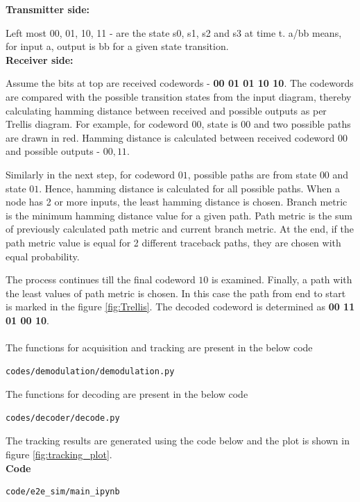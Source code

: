 \textbf{Transmitter side:} 

\noindent Left most 00, 01, 10, 11 - are the state s0, s1, s2 and s3 at time t. a/bb means, for input a, output is bb for a given state transition.
\\
\textbf{Receiver side:} 

\noindent Assume the bits at top are received codewords - \textbf{00 01 01 10 10}. The codewords are compared with the possible transition states from the input diagram, thereby calculating hamming distance between received and possible outputs as per Trellis diagram. For example, for codeword $00$, state is $00$ and two possible paths are drawn in red. Hamming distance is calculated between received codeword $00$ and possible outputs - $00, 11$.

\noindent Similarly in the next step, for codeword $01$, possible paths are from state $00$ and state $01$. Hence, hamming distance is calculated for all possible paths. When a node has 2 or more inputs, the least hamming distance is chosen. Branch metric is the minimum hamming distance value for a given path. Path metric is the sum of previously calculated path metric and current branch metric. At the end, if the path metric value is equal for 2 different traceback paths, they are chosen with equal probability.

\noindent The process continues till the final codeword $10$ is examined. Finally, a path with the least values of path metric is chosen. In this case the path from end to start is marked in the figure \ref{fig:Trellis}. The decoded codeword is determined as \textbf{00 11 01 00 10}.
\\
\\
The functions for acquisition and tracking are present in the below code
\begin{lstlisting}
codes/demodulation/demodulation.py
\end{lstlisting}
The functions for decoding are present in the below code
\begin{center}
 \begin{lstlisting}
codes/decoder/decode.py
 \end{lstlisting}
\end{center}
The tracking results are generated using the code below and the plot is shown in figure \ref{fig:tracking_plot}.\\
\textbf{Code}
\begin{lstlisting}
code/e2e_sim/main_ipynb
\end{lstlisting}






